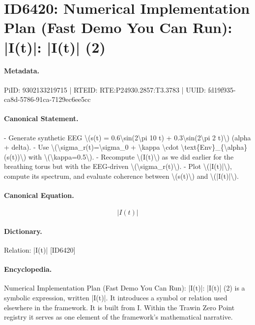 \section*{ID6420: Numerical Implementation Plan (Fast Demo You Can Run): |I(t)|: |I(t)| (2)}
\paragraph{Metadata.}
PiID: 9302133219715 | RTEID: RTE:P24930.2857:T3.3783 | UUID: fd19f935-ca8d-5786-91ca-7129ec6ee5cc

\paragraph{Canonical Statement.}
- Generate synthetic EEG \textbackslash{}(s(t) = 0.6\textbackslash{}sin(2\textbackslash{}pi 10 t) + 0.3\textbackslash{}sin(2\textbackslash{}pi 2 t)\textbackslash{}) (alpha + delta). - Use \textbackslash{}(\textbackslash{}sigma\_r(t)=\textbackslash{}sigma\_0 + \textbackslash{}kappa \textbackslash{}cdot \textbackslash{}text\{Env\}\_\{\textbackslash{}alpha\}(s(t))\textbackslash{}) with \textbackslash{}(\textbackslash{}kappa=0.5\textbackslash{}). - Recompute \textbackslash{}(I(t)\textbackslash{}) as we did earlier for the breathing torus but with the EEG-driven \textbackslash{}(\textbackslash{}sigma\_r(t)\textbackslash{}). - Plot \textbackslash{}(|I(t)|\textbackslash{}), compute its spectrum, and evaluate coherence between \textbackslash{}(s(t)\textbackslash{}) and \textbackslash{}(|I(t)|\textbackslash{}).

\paragraph{Canonical Equation.}
\[
|I(t)|
\]

\paragraph{Dictionary.}
Relation: |I(t)| [ID6420]

\paragraph{Encyclopedia.}
Numerical Implementation Plan (Fast Demo You Can Run): |I(t)|: |I(t)| (2) is a symbolic expression, written |I(t)|. It introduces a symbol or relation used elsewhere in the framework. It is built from I. Within the Trawin Zero Point registry it serves as one element of the framework's mathematical narrative.
